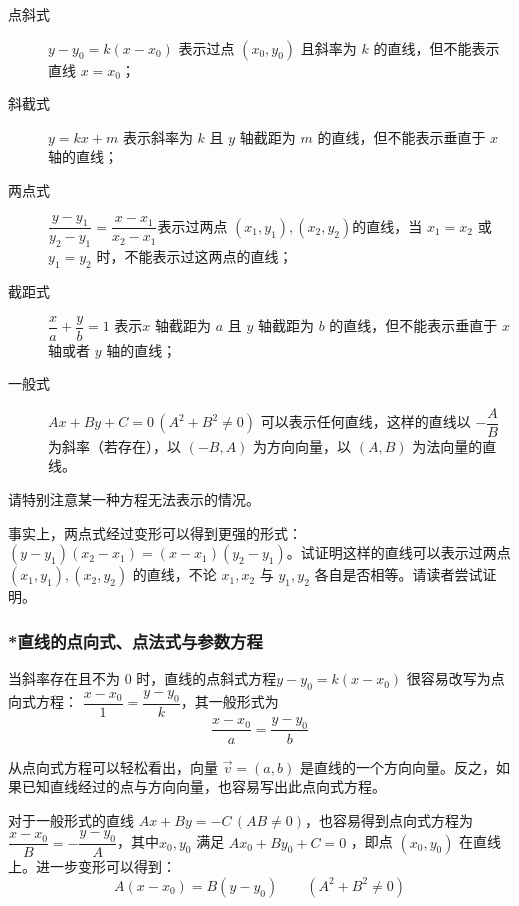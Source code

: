 \documentclass[a4paper,openany]{ctexbook}
\renewcommand{\vec}{\overrightarrow}
\begin{document}
\begin{description}
    \item[点斜式] \(y - y_0 = k(x - x_0)\) 表示过点 \((x_0,y_0)\) 且斜率为 \(k\) 的直线，但不能表示直线 \(x = x_0\)；
    \item[斜截式] \(y = kx + m\) 表示斜率为 \(k\) 且 \(y\) 轴截距为 \(m\) 的直线，但不能表示垂直于 \(x\) 轴的直线；
    \item[两点式] \(\dfrac{y - y_1}{y_2 - y_1} = \dfrac{x - x_1}{x_2 - x_1} \)表示过两点 \((x_1,y_1),(x_2,y_2)\)的直线，当 \(x_1 = x_2\) 或 \(y_1 = y_2\) 时，不能表示过这两点的直线；
    \item[截距式] \(\dfrac{x}{a} + \dfrac{y}{b}= 1\) 表示\(x\) 轴截距为 \(a\) 且 \(y\) 轴截距为 \(b\) 的直线，但不能表示垂直于 \(x\) 轴或者 \(y\) 轴的直线；
    \item[一般式] \(Ax + By + C = 0\, (A^2 + B^2\neq 0)\) 可以表示任何直线，这样的直线以 \( - \dfrac{A}{B}\) 为斜率（若存在），以 \(( - B,A)\) 为方向向量，以 \((A,B)\) 为法向量的直线。
\end{description}

请特别注意某一种方程无法表示的情况。

事实上，两点式经过变形可以得到更强的形式： \((y - y_1)(x_2 - x_1) =(x - x_1)(y_2 - y_1)\)。试证明这样的直线可以表示过两点 \((x_1,y_1),(x_2,y_2)\) 的直线，不论 \(x_1,x_2\) 与 \(y_1,y_2\) 各自是否相等。请读者尝试证明。%

\subsubsection{*直线的点向式、点法式与参数方程}

当斜率存在且不为 \(0\) 时，直线的点斜式方程\(y - y_0 = k(x - x_0)\) 很容易改写为点向式方程： \(\dfrac{x - x_0}{1} = \dfrac{y - y_0}{k}\)，其一般形式为 \[\dfrac{x - x_0}{a} = \dfrac{y - y_0}{b}\]

从点向式方程可以轻松看出，向量 \(\vec{v} =(a,b)\) 是直线的一个方向向量。反之，如果已知直线经过的点与方向向量，也容易写出此点向式方程。

对于一般形式的直线 \(Ax + By =- C\, (AB \neq 0)\)，也容易得到点向式方程为 \(\dfrac{x- x_0}{B} = -\dfrac{y - y_0}{A} \)，其中\(x_0,y_0\) 满足 \(Ax_0 + By_0 + C= 0\) ，即点 \((x_0,y_0)\) 在直线上。进一步变形可以得到：
\[A(x - x_0) = B(y - y_0)\qquad (A^2 + B^2 \neq 0)\]
\end{document}
